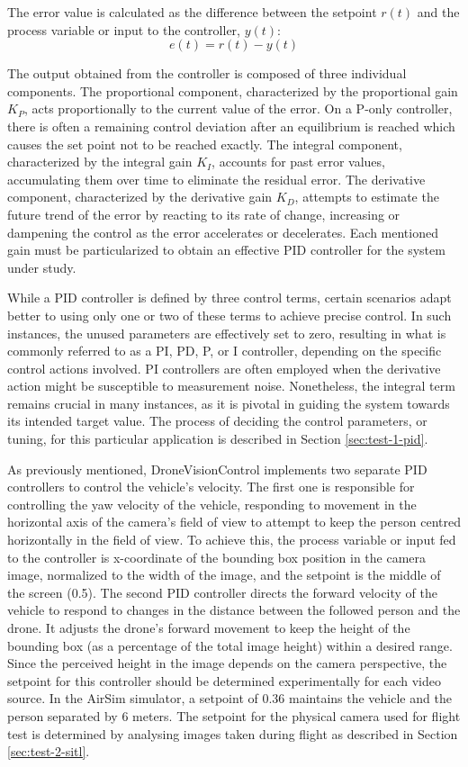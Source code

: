 The error value is calculated as the difference between the setpoint $r(t)$ and the process variable or input to the controller, $y(t)$:
\begin{equation}
    e(t)= r(t) - y(t)
\end{equation}

The output obtained from the controller is composed of three individual components. The proportional component, characterized by the proportional gain $K_P$, acts proportionally to the current value of the error. On a P-only controller, there is often a remaining control deviation after an equilibrium is reached which causes the set point not to be reached exactly. The integral component, characterized by the integral gain $K_I$, accounts for past error values, accumulating them over time to eliminate the residual error. The derivative component, characterized by the derivative gain $K_D$, attempts to estimate the future trend of the error by reacting to its rate of change, increasing or dampening the control as the error accelerates or decelerates. Each mentioned gain must be particularized to obtain an effective PID controller for the system under study.

While a PID controller is defined by three control terms, certain scenarios adapt better to using only one or two of these terms to achieve precise control. In such instances, the unused parameters are effectively set to zero, resulting in what is commonly referred to as a PI, PD, P, or I controller, depending on the specific control actions involved. PI controllers are often employed when the derivative action might be susceptible to measurement noise. Nonetheless, the integral term remains crucial in many instances, as it is pivotal in guiding the system towards its intended target value. The process of deciding the control parameters, or tuning, for this particular application is described in Section \ref{sec:test-1-pid}.

As previously mentioned, DroneVisionControl implements two separate PID controllers to control the vehicle's velocity.
The first one is responsible for controlling the yaw velocity of the vehicle, responding to movement in the horizontal axis of the camera's field of view to attempt to keep the person centred horizontally in the field of view. To achieve this, the process variable or input fed to the controller is x-coordinate of the bounding box position in the camera image, normalized to the width of the image, and the setpoint is the middle of the screen (0.5).
The second PID controller directs the forward velocity of the vehicle to respond to changes in the distance between the followed person and the drone. It adjusts the drone's forward movement to keep the height of the bounding box (as a percentage of the total image height) within a desired range. Since the perceived height in the image depends on the camera perspective, the setpoint for this controller should be determined experimentally for each video source.
In the AirSim simulator, a setpoint of 0.36 maintains the vehicle and the person separated by 6 meters. The setpoint for the physical camera used for flight test is determined by analysing images taken during flight as described in Section \ref{sec:test-2-sitl}.

